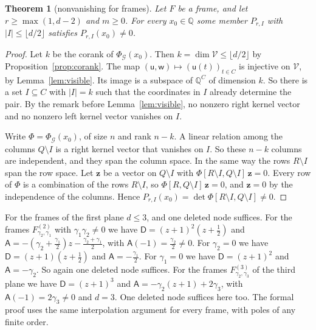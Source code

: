 \documentclass[11pt]{amsart}
\newtheorem{theorem}{Theorem}[section]
\theoremstyle{definition}
\theoremstyle{remark}
\numberwithin{equation}{section}
\newcommand{\Q}{\mathbb Q}
\begin{document}
\begin{theorem}[nonvanishing for frames]\label{thm:nvframe}
Let $F$ be a frame, and let $r\ge\max(1,d-2)$ and $m\ge0$. For every $x_0\in\Q$ some member $P_{r,I}$ with
$|I|\le\lfloor d/2\rfloor$ satisfies $P_{r,I}(x_0)\ne0$.
\end{theorem}

\begin{proof}
Let $k$ be the corank of $\Phi_{\mathcal G}(x_0)$. Then $k=\dim\mathcal V\le\lfloor d/2\rfloor$ by
Proposition~\ref{prop:corank}. The map $(\mathsf u,\mathsf w)\mapsto(\mathsf u(t))_{t\in C}$ is injective on
$\mathcal V$, by Lemma~\ref{lem:visible}. Its image is a subspace of $\Q^C$ of dimension $k$. So there is a set
$I\subseteq C$ with $|I|=k$ such that the coordinates in $I$ already determine the pair. By the remark before
Lemma~\ref{lem:visible}, no nonzero right kernel vector and no nonzero left kernel vector vanishes on $I$.

Write $\Phi=\Phi_{\mathcal G}(x_0)$, of size $n$ and rank $n-k$. A linear relation among the columns $Q\setminus I$
is a right kernel vector that vanishes on $I$. So these $n-k$ columns are independent, and they span the column space.
In the same way the rows $R\setminus I$ span the row space. Let $\mathbf z$ be a vector on $Q\setminus I$ with
$\Phi[R\setminus I,Q\setminus I]\,\mathbf z=0$. Every row of $\Phi$ is a combination of the rows $R\setminus I$, so
$\Phi[R,Q\setminus I]\,\mathbf z=0$, and $\mathbf z=0$ by the independence of the columns. Hence
$P_{r,I}(x_0)=\det\Phi[R\setminus I,Q\setminus I]\ne0$.
\end{proof}

For the frames of the first plane $d\le3$, and one deleted node suffices. For the frames $F^{(2)}_{\gamma_2,\gamma_1}$ with $\gamma_1\gamma_2\ne0$
we have $\mathsf D=(z+1)^2(z+\frac12)$ and $\mathsf A=-(\gamma_2+\frac{\gamma_1}2)z-\frac{\gamma_2+\gamma_1}2$, with
$\mathsf A(-1)=\frac{\gamma_2}2\ne0$. For $\gamma_2=0$ we have $\mathsf D=(z+1)(z+\frac12)$ and
$\mathsf A=-\frac{\gamma_1}2$. For $\gamma_1=0$ we have $\mathsf D=(z+1)^2$ and $\mathsf A=-\gamma_2$. So again one
deleted node suffices. For the frames $F^{(3)}_{\gamma_2,\gamma_3}$ of the third plane we have $\mathsf D=(z+1)^3$ and
$\mathsf A=-\gamma_2(z+1)+2\gamma_3$, with $\mathsf A(-1)=2\gamma_3\ne0$ and $d=3$. One deleted node suffices here too.
The formal proof uses the same interpolation argument for every frame, with poles of any finite order.
\end{document}
